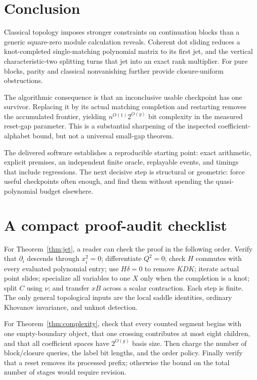 \documentclass[11pt]{article}
\theoremstyle{definition}\newtheorem{definition}[theorem]{Definition}\newtheorem{example}[theorem]{Example}
\theoremstyle{remark}\newtheorem{remark}[theorem]{Remark}
\begin{document}
\section{Conclusion}
Classical topology imposes stronger constraints on continuation blocks than a generic square-zero module calculation reveals. Coherent dot sliding reduces a knot-completed single-matching polynomial matrix to its first jet, and the vertical characteristic-two splitting turns that jet into an exact rank multiplier. For pure blocks, parity and classical nonvanishing further provide closure-uniform obstructions.

The algorithmic consequence is that an inconclusive usable checkpoint has one survivor. Replacing it by its actual matching completion and restarting removes the accumulated frontier, yielding $n^{O(1)}2^{O(g)}$ bit complexity in the measured reset-gap parameter. This is a substantial sharpening of the inspected coefficient-alphabet bound, but not a universal small-gap theorem.

The delivered software establishes a reproducible starting point: exact arithmetic, explicit premises, an independent finite oracle, replayable events, and timings that include regressions. The next decisive step is structural or geometric: force useful checkpoints often enough, and find them without spending the quasi-polynomial budget elsewhere.

\appendix
\section{A compact proof-audit checklist}
For Theorem~\ref{thm:jet}, a reader can check the proof in the following order. Verify that $\partial_i$ descends through $x_i^2=0$; differentiate $Q^2=0$; check $H$ commutes with every evaluated polynomial entry; use $H\delta=0$ to remove $KDK$; iterate actual point slides; specialize all variables to one $X$ only when the completion is a knot; split $C$ using $\nu$; and transfer $xB$ across a scalar contraction. Each step is finite. The only general topological inputs are the local saddle identities, ordinary Khovanov invariance, and unknot detection.

For Theorem~\ref{thm:complexity}, check that every counted segment begins with one empty-boundary object, that one crossing contributes at most eight children, and that all coefficient spaces have $2^{O(g)}$ basis size. Then charge the number of block/closure queries, the label bit lengths, and the order policy. Finally verify that a reset removes its processed prefix; otherwise the bound on the total number of stages would require revision.
\end{document}
